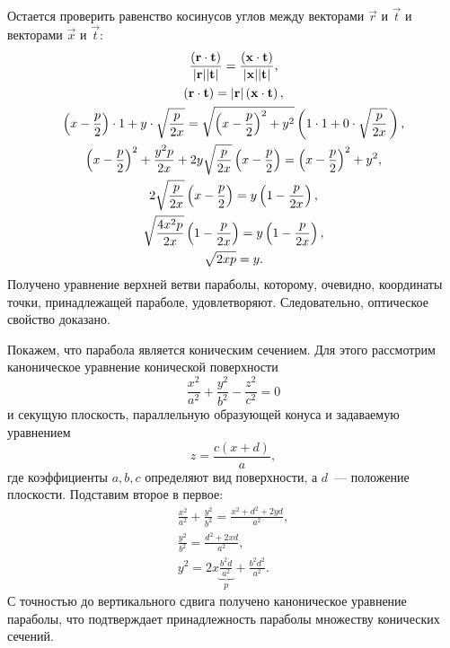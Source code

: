 Остается проверить равенство косинусов углов между векторами $\vec r$ и $\vec t$ и векторами $\vec x$ и $\vec t$:
\begin{gather*}
	\frac{\left(\mathbf{r} \cdot \mathbf{t}\right)}{|\mathbf{r}| | \mathbf{t}|} = \frac{\left(\mathbf{x} \cdot \mathbf{t}\right)}{|\mathbf{x}| |\mathbf{t}|},\\
	\left(\mathbf{r} \cdot \mathbf{t}\right) = |\mathbf{r}| \left(\mathbf{x} \cdot \mathbf{t}\right),\\
	\left(x - \frac{p}{2}\right)\cdot 1 + y \cdot \sqrt{\frac{p}{2x}}  = \sqrt{\left( x - \frac{p}{2} \right)^2 + y^2 } \left(1 \cdot 1 + 0 \cdot \sqrt{\frac{p}{2x}} \,\right),\\
	\left(x - \frac{p}{2}\right)^2 + \frac{y^2 p}{2x} + 2 y \sqrt{\frac{p}{2x}} \left(x - \frac{p}{2}\right) = \left(x - \frac{p}{2}\right)^2 + y^2,\\
	2  \sqrt{\frac{p}{2x}} \left(x - \frac{p}{2}\right) =  y \left( 1 - \frac{p}{2x} \right),\\
	\sqrt{\frac{4x^2p}{2x}} \left(1 - \frac{p}{2x}\right) =  y \left( 1 - \frac{p}{2x} \right),\\
	\sqrt{2xp}  =  y.
\end{gather*}
Получено уравнение верхней ветви параболы, которому, очевидно, координаты точки, принадлежащей параболе, удовлетворяют. Следовательно, оптическое свойство доказано.

Покажем, что парабола является коническим сечением. Для этого рассмотрим каноническое уравнение конической поверхности
\begin{equation*}
	\frac{x^2}{a^2} + \frac{y^2}{b^2} - \frac{z^2}{c^2} = 0
\end{equation*}
и секущую плоскость, параллельную образующей конуса и задаваемую уравнением
\begin{equation*}
	z = \frac{c(x + d)}{a},
\end{equation*}
где коэффициенты $a, b, c$ определяют вид поверхности, а $d$~--- положение плоскости. Подставим второе в первое:
\begin{gather*}
	\frac{x^2}{a^2} + \frac{y^2}{b^2} = \frac{x^2 + d^2 + 2yd}{a^2},\\
	\frac{y^2}{b^2} = \frac{d^2 + 2xd}{a^2},\\
	y^2 = 2 x \underbrace{\frac{b^2d}{a^2}}_p + \frac{b^2 d^2}{a^2}.
\end{gather*}
С точностью до вертикального сдвига получено каноническое уравнение параболы, что подтверждает принадлежность параболы множеству конических сечений.

